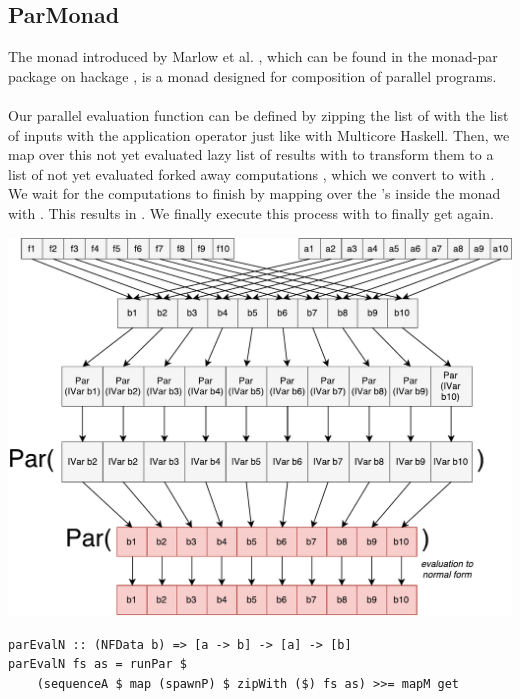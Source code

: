 \subsection{ParMonad}
The  monad introduced by Marlow et al. \cite{monad_par_paper_2011}, which can be found in the monad-par package on hackage \cite{monad_par_hackage}, is a monad designed for composition of parallel programs.
\\\\
Our parallel evaluation function  can be defined by zipping the list of \code{[a -> b]} with the list of inputs \code{[a]} with the application operator \code{\$} just like with Multicore Haskell. Then, we map over this not yet evaluated lazy list of results \code{[b]} with  to transform them to a list of not yet evaluated forked away computations , which we convert to  with . We wait for the computations to finish by mapping over the 's inside the  monad with . This results in . We finally execute this process with  to finally get \code{[b]} again.
\begin{center}
	\includegraphics[scale=0.5]{images/parEvalNParMonad}
\end{center}
\begin{lstlisting}[frame=htrbl]
parEvalN :: (NFData b) => [a -> b] -> [a] -> [b]
parEvalN fs as = runPar $ 
	(sequenceA $ map (spawnP) $ zipWith ($) fs as) >>= mapM get
\end{lstlisting}


